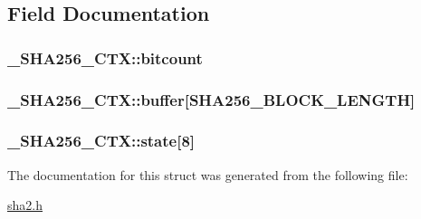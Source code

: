 \subsection{Field Documentation}
\hypertarget{struct__SHA256__CTX_ae03d7f91de6eb6cb110d3d054e58d935}{
\subsubsection[{bitcount}]{ \-\_\-\-S\-H\-A256\-\_\-\-C\-T\-X\-::bitcount}}\label{struct__SHA256__CTX_ae03d7f91de6eb6cb110d3d054e58d935}
\hypertarget{struct__SHA256__CTX_ae1c9099b16619b706dbc88203ce3c189}{
\subsubsection[{buffer}]{ \-\_\-\-S\-H\-A256\-\_\-\-C\-T\-X\-::buffer\mbox{[}{\bf S\-H\-A256\-\_\-\-B\-L\-O\-C\-K\-\_\-\-L\-E\-N\-G\-T\-H}\mbox{]}}}\label{struct__SHA256__CTX_ae1c9099b16619b706dbc88203ce3c189}
\hypertarget{struct__SHA256__CTX_a0735cc1e8e2d7e0f2fc54cec5c05b1d3}{
\subsubsection[{state}]{ \-\_\-\-S\-H\-A256\-\_\-\-C\-T\-X\-::state\mbox{[}8\mbox{]}}}\label{struct__SHA256__CTX_a0735cc1e8e2d7e0f2fc54cec5c05b1d3}


The documentation for this struct was generated from the following file\-:\begin{DoxyCompactItemize}
\item 
\hyperlink{sha2_8h}{sha2.\-h}\end{DoxyCompactItemize}
